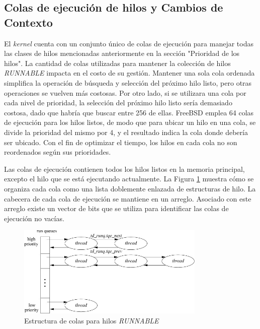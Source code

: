 \subsection{Colas de ejecución de hilos y Cambios de Contexto}

El \textit{kernel} cuenta con un conjunto único de colas de ejecución para manejar todas las clases de hilos mencionadas anteriormente en la sección "Prioridad de los hilos". La cantidad de colas utilizadas para mantener la colección de hilos \textit{RUNNABLE} impacta en el costo de su gestión. Mantener una sola cola ordenada simplifica la operación de búsqueda y selección del próximo hilo listo, pero otras operaciones se vuelven más costosas. Por otro lado, si se utilizara una cola por cada nivel de prioridad, la selección del próximo hilo listo sería demasiado costosa, dado que habría que buscar entre 256 de ellas. FreeBSD emplea 64 colas de ejecución para los hilos listos, de modo que para ubicar un hilo en una cola, se divide la prioridad del mismo por 4, y el resultado indica la cola donde debería ser ubicado. Con el fin de optimizar el tiempo, los hilos en cada cola no son reordenados según sus prioridades.\par

Las colas de ejecución contienen todos los hilos listos en la memoria principal, excepto el hilo que se está ejecutando actualmente. La Figura \ref{fig:queueing-structure} muestra cómo se organiza cada cola como una lista doblemente enlazada de estructuras de hilo. La cabecera de cada cola de ejecución se mantiene en un arreglo. Asociado con este arreglo existe un vector de bits que se utiliza para identificar las colas de ejecución no vacías.\par

\begin{figure}[H]
    \centering
    \vspace*{0.2in}
    \includegraphics[width=0.8\textwidth]{./images/queueing-structure.jpg}
    \caption{Estructura de colas para hilos \textit{RUNNABLE}}
    \label{fig:queueing-structure}
\end{figure}

